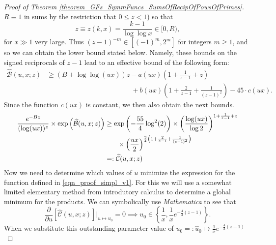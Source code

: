 \documentclass[11pt,reqno,a4letter]{article}
\numberwithin{figure}{section}
\numberwithin{table}{section}
\theoremstyle{plain}
\numberwithin{theorem}{section}
\theoremstyle{definition}
\begin{document}
\begin{proof}[Proof of Theorem \ref{theorem_GFs_SymmFuncs_SumsOfRecipOfPowsOfPrimes}]
$R \equiv 1$ in sums by the restriction that $0 \leq z < 1$) so that 
$$z \equiv z(k, x) = \frac{k-1}{\log\log x} \in [0, R),$$ for $x \gg 1$ very large. 
Thus $(z-1)^{-m} \in [(-1)^m, 2^m]$ for integers $m \geq 1$, and so we can obtain the 
lower bound stated below. Namely, these bounds on the signed reciprocals of $z-1$ 
lead to an effective bound of the following form: 
\begin{align*} 
\widehat{\mathcal{B}}(u, x; z) & \geq (B + \log\log (ux)) z - a(ux) \left(1 + \frac{1}{z-1} + z\right) \\ 
     & \phantom{= (B + \log\log (ux)) z\ } + 
     b(ux) \left( 
     1 + \frac{2}{z-1} + \frac{1}{(z-1)^2}\right) - 
     45 \cdot c(ux). 
\end{align*} 
Since the function $c(ux)$ is constant, we then also obtain the next bounds. 
\begin{align} 
\notag 
\frac{e^{-Bz}}{(\log (ux))^{z}} \times \exp\left(\widehat{\mathcal{B}}(u, x; z)\right) & \geq 
    \exp\left(-\frac{55}{4} \log^2(2)\right) \times \left(\frac{\log(ux)}{\log 2}\right)^{1 + \frac{1}{z-1} + z} \\ 
\notag 
    & \phantom{\geq \times} \times \left(\frac{ux}{2}\right)^{\frac{3}{4}\left(1 + \frac{2}{z-1} + \frac{1}{(z-1)^2}\right)} \\ 
\label{eqn_proof_simpl_v1} 
     & =: \widehat{\mathcal{C}}(u, x; z) 
\end{align} 
Now we need to determine which values of $u$ minimize the expression for the function defined 
in \eqref{eqn_proof_simpl_v1}. 
For this we will use a somewhat limited elementary method from 
introdutory calculus to determine a global minimum for the products. 
We can symbolically use \emph{Mathematica} to see that 
\[
\frac{\partial}{\partial u}\left[\widehat{\mathcal{C}}(u, x; z)\right] \Biggr\rvert_{u \mapsto u_0} = 0 \implies 
     u_0 \in \left\{\frac{1}{x}, \frac{1}{x} e^{-\frac{4}{3}(z-1)}\right\}. 
\]
When we substitute this outstanding parameter value of $u_0 =: \hat{u}_0 \mapsto \frac{1}{x} e^{-\frac{4}{3}(z-1)}$ 

\end{proof}
\end{document}

